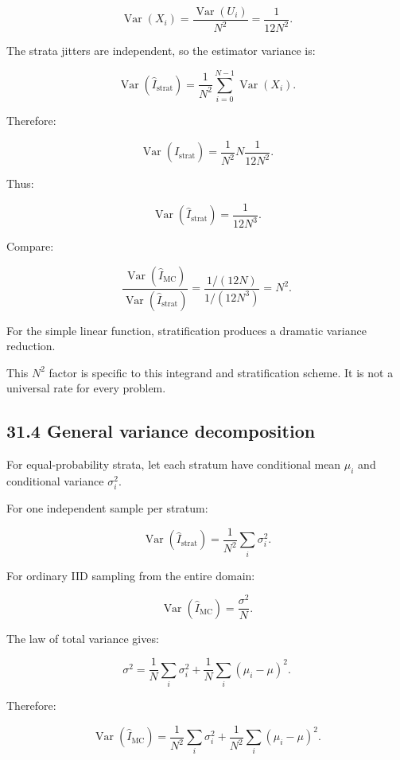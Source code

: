 \[ \operatorname{Var}(X_i) = \frac{\operatorname{Var}(U_i)}{N^2} = \frac1{12N^2}. \]

The strata jitters are independent, so the estimator variance is:

\[ \operatorname{Var}(\widehat I_{\mathrm{strat}}) = \frac1{N^2} \sum_{i=0}^{N-1}\operatorname{Var}(X_i). \]

Therefore:

\[ \operatorname{Var}(\widehat I_{\mathrm{strat}}) = \frac1{N^2} N\frac1{12N^2}. \]

Thus:

\[ \boxed{ \operatorname{Var}(\widehat I_{\mathrm{strat}}) = \frac1{12N^3} }. \]

Compare:

\[ \frac{ \operatorname{Var}(\widehat I_{\mathrm{MC}}) }{ \operatorname{Var}(\widehat I_{\mathrm{strat}}) } = \frac{1/(12N)}{1/(12N^3)} = \boxed{N^2}. \]

For the simple linear function, stratification produces a dramatic variance reduction.

This \(N^2\) factor is specific to this integrand and stratification scheme. It is not a universal rate for every problem.

\subsection{31.4 General variance decomposition}\label{02-foundations-ii-ch031-general-variance-decomposition}

\hypertarget{02-foundations-ii-ch031-general-variance-decomposition}{}

For equal-probability strata, let each stratum have conditional mean \(\mu_i\) and conditional variance \(\sigma_i^2\).

For one independent sample per stratum:

\[ \boxed{ \operatorname{Var}(\widehat I_{\mathrm{strat}}) = \frac1{N^2}\sum_i\sigma_i^2 }. \]

For ordinary IID sampling from the entire domain:

\[ \operatorname{Var}(\widehat I_{\mathrm{MC}}) = \frac{\sigma^2}{N}. \]

The law of total variance gives:

\[ \sigma^2= \frac1N\sum_i\sigma_i^2 + \frac1N\sum_i(\mu_i-\mu)^2. \]

Therefore:

\[ \operatorname{Var}(\widehat I_{\mathrm{MC}}) = \frac1{N^2}\sum_i\sigma_i^2 + \frac1{N^2}\sum_i(\mu_i-\mu)^2. \]

